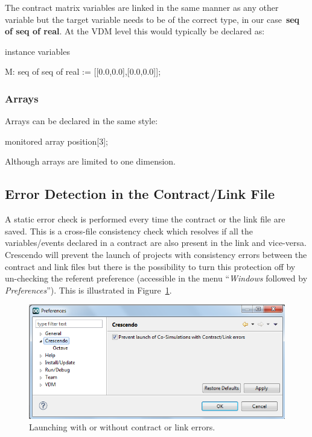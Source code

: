 \documentclass{crescendorepchap}
\newcommand{\vdmkeyw}[1]{{\bf\ttfamily #1}}
\begin{document}
The contract matrix variables are linked in the same manner as any other
variable but the target variable needs to be of the correct type, in our
case~\vdmkeyw{seq of seq of real}. At the VDM level this would typically 
be declared as:

\begin{vdmrt}
instance variables

    M: seq of seq of real := [[0.0,0.0],[0.0,0.0]];
\end{vdmrt}

\subsubsection{Arrays}

Arrays can be declared in the same style:

\begin{dcl}
monitored array position[3];
\end{dcl}

Although arrays are limited to one dimension.

\subsection{Error Detection in the Contract/Link File}

A static error check is performed every time the contract or the
link file are saved. This is a
cross-file consistency check which resolves if all the variables/events
declared in a contract are also present in the link and vice-versa.
Crescendo will prevent the launch of projects with consistency errors
between the contract and link files but there is the possibility to turn
this protection off by un-checking the referent preference (accessible
in the menu ``\emph{Windows} followed by \emph{Preferences}''). This is illustrated in Figure~\ref{fig:linkerrors}.

\begin{figure}[htbp]
\centering
\includegraphics[width=.8\textwidth]{images/DestecsPreferences.png}
\caption{Launching with or without contract or link errors.\label{fig:linkerrors}}
\end{figure}
\end{document}
